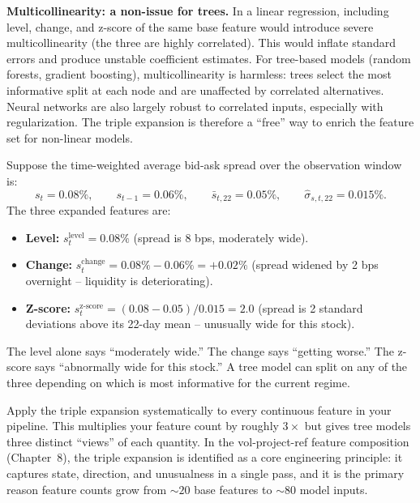\textbf{Multicollinearity: a non-issue for trees.}
In a linear regression, including level, change, and z-score of the same base feature would introduce severe multicollinearity (the three are highly correlated).
This would inflate standard errors and produce unstable coefficient estimates.
For tree-based models (random forests, gradient boosting), multicollinearity is harmless: trees select the most informative split at each node and are unaffected by correlated alternatives.
Neural networks are also largely robust to correlated inputs, especially with regularization.
The triple expansion is therefore a ``free'' way to enrich the feature set for non-linear models.

\begin{workedexample}
Suppose the time-weighted average bid-ask spread over the observation window is:
\[
s_t = 0.08\%, \qquad s_{t-1} = 0.06\%, \qquad \bar{s}_{t,22} = 0.05\%, \qquad \hat{\sigma}_{s,t,22} = 0.015\%.
\]
The three expanded features are:
\begin{itemize}[nosep]
  \item \textbf{Level:} $s_t^{\text{level}} = 0.08\%$ (spread is 8 bps, moderately wide).
  \item \textbf{Change:} $s_t^{\text{change}} = 0.08\% - 0.06\% = +0.02\%$ (spread widened by 2 bps overnight -- liquidity is deteriorating).
  \item \textbf{Z-score:} $s_t^{\text{z-score}} = (0.08 - 0.05)/0.015 = 2.0$ (spread is 2 standard deviations above its 22-day mean -- unusually wide for this stock).
\end{itemize}
The level alone says ``moderately wide.'' The change says ``getting worse.'' The z-score says ``abnormally wide for this stock.'' A tree model can split on any of the three depending on which is most informative for the current regime.
\end{workedexample}

\begin{projectconnection}
Apply the triple expansion systematically to every continuous feature in your pipeline. This multiplies your feature count by roughly $3\times$ but gives tree models three distinct ``views'' of each quantity. In the vol-project-ref feature composition (Chapter~8), the triple expansion is identified as a core engineering principle: it captures state, direction, and unusualness in a single pass, and it is the primary reason feature counts grow from ${\sim}20$ base features to ${\sim}80$ model inputs.
\end{projectconnection}

